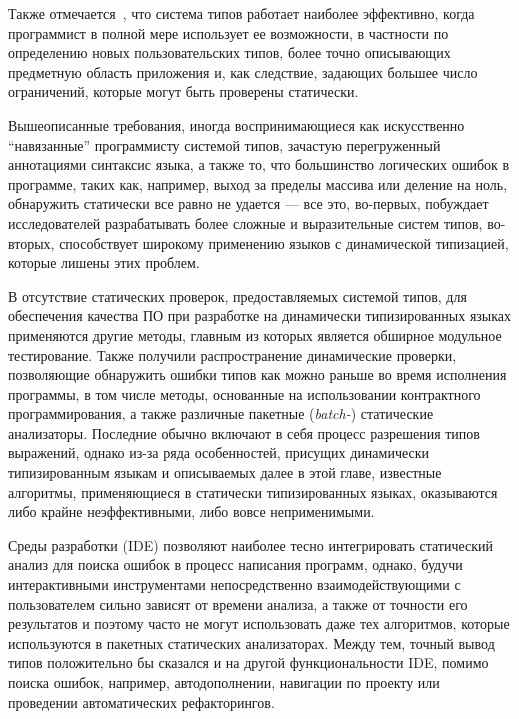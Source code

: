 Также отмечается~\cite{Pierce2002}, что система типов работает наиболее
эффективно, когда программист в полной мере использует ее возможности, в
частности по определению новых пользовательских типов, более точно описывающих
предметную область приложения и, как следствие, задающих большее число
ограничений, которые могут быть проверены статически.


Вышеописанные требования, иногда воспринимающиеся как искусственно ``навязанные''
программисту системой типов, зачастую перегруженный аннотациями синтаксис языка,
а также то, что большинство логических ошибок в программе, таких как, например,
выход за пределы массива или деление на ноль, обнаружить статически все равно не
удается --- все это, во-первых, побуждает исследователей разрабатывать более
сложные и выразительные систем типов, во-вторых, способствует широкому
применению языков с динамической типизацией, которые лишены этих проблем.

В отсутствие статических проверок, предоставляемых системой типов, для
обеспечения качества ПО при разработке на динамически типизированных языках
применяются другие методы, главным из которых является обширное модульное
тестирование. Также получили распространение динамические проверки, позволяющие
обнаружить ошибки типов как можно раньше во время исполнения программы, в том
числе методы, основанные на использовании контрактного программирования, а также
различные пакетные (\emph{batch-}) статические анализаторы. Последние обычно
включают в себя процесс разрешения типов выражений, однако из-за ряда
особенностей, присущих динамически типизированным языкам и описываемых далее в
этой главе, известные алгоритмы, применяющиеся в статически типизированных
языках, оказываются либо крайне неэффективными, либо вовсе неприменимыми.

Среды разработки (IDE) позволяют наиболее тесно интегрировать статический анализ
для поиска ошибок в процесс написания программ, однако, будучи
интерактивными инструментами непосредственно взаимодействующими с пользователем
сильно зависят от времени анализа, а также от точности его результатов и поэтому
часто не могут использовать даже тех алгоритмов, которые используются в пакетных
статических анализаторах. Между тем, точный вывод типов положительно бы сказался
и на другой функциональности IDE, помимо поиска ошибок, например,
автодополнении, навигации по проекту или проведении автоматических
рефакторингов.

